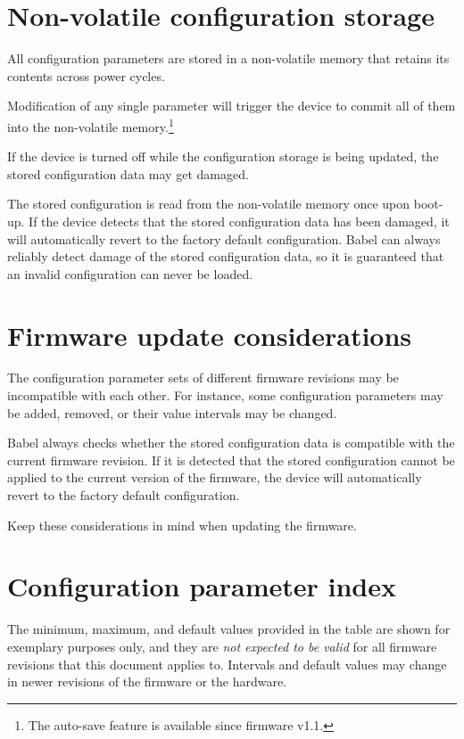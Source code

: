 \documentclass{zubaxdoc}
\begin{document}
\section{Non-volatile configuration storage}

All configuration parameters are stored in a non-volatile memory
that retains its contents across power cycles.

Modification of any single parameter will trigger the device to commit all of them into the non-volatile
memory.\footnote{The auto-save feature is available since firmware v1.1.}

If the device is turned off while the configuration storage is being updated,
the stored configuration data may get damaged.

The stored configuration is read from the non-volatile memory once upon boot-up.
If the device detects that the stored configuration data has been damaged,
it will automatically revert to the factory default configuration.
Babel can always reliably detect damage of the stored configuration data,
so it is guaranteed that an invalid configuration can never be loaded.

\section{Firmware update considerations}

The configuration parameter sets of different firmware revisions may be incompatible with each other.
For instance, some configuration parameters may be added, removed, or their value intervals may be changed.

Babel always checks whether the stored configuration data is compatible with the current
firmware revision.
If it is detected that the stored configuration cannot be applied to the current version of the firmware,
the device will automatically revert to the factory default configuration.

Keep these considerations in mind when updating the firmware.

\section{Configuration parameter index}

The minimum, maximum, and default values provided in the table are shown for exemplary purposes only,
and they are \emph{not expected to be valid} for all firmware revisions that this document applies to.
Intervals and default values may change in newer revisions of the firmware or the hardware.
\end{document}

